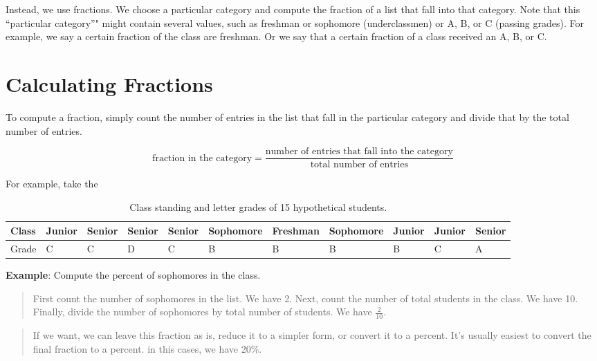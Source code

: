\documentclass[]{book}
\theoremstyle{definition}
\theoremstyle{definition}
\theoremstyle{definition}
\theoremstyle{remark}
\begin{document}
Instead, we use fractions. We choose a particular category and compute
the fraction of a list that fall into that category. Note that this
``particular category''" might contain several values, such as freshman
or sophomore (underclassmen) or A, B, or C (passing grades). For
example, we say a certain fraction of the class are freshman. Or we say
that a certain fraction of a class received an A, B, or C.

\section{Calculating Fractions}\label{calculating-fractions}

To compute a fraction, simply count the number of entries in the list
that fall in the particular category and divide that by the total number
of entries.

\[\text{fraction in the category} = \dfrac{\text{number of entries that fall into the category}}{\text{total number of entries}}\]

For example, take the

\begin{table}

\caption{\label{tab:unnamed-chunk-1}Class standing and letter grades of 15 hypothetical students.}
\centering
\begin{tabular}[t]{l|l|l|l|l|l|l|l|l|l|l}
\hline
Class & Junior & Senior & Senior & Senior & Sophomore & Freshman & Sophomore & Junior & Junior & Senior\\
\hline
Grade & C & C & D & C & B & B & B & B & C & A\\
\hline
\end{tabular}
\end{table}

\textbf{Example}: Compute the percent of sophomores in the class.

\begin{quote}
First count the number of sophomores in the list. We have 2. Next, count
the number of total students in the class. We have 10. Finally, divide
the number of sophomores by total number of students. We have
\(\frac{2}{10}\).
\end{quote}

\begin{quote}
If we want, we can leave this fraction as is, reduce it to a simpler
form, or convert it to a percent. It's usually easiest to convert the
final fraction to a percent. in this cases, we have 20\%.
\end{quote}
\end{document}
